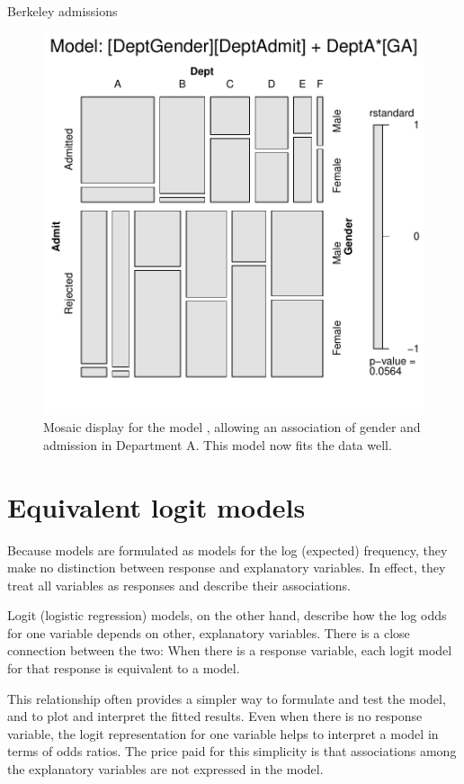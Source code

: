 \documentclass[11pt]{book}\usepackage[]{graphicx}\usepackage[]{color}
\newenvironment{knitrout}{}{} %
\renewenvironment{knitrout}{\small\renewcommand{\baselinestretch}{.85}}{} %
\begin{document}
\begin{Example}[berkeley6]{Berkeley admissions}
\begin{knitrout}
\begin{figure}[!htb]
\centerline{\includegraphics[width=.7\textwidth]{ch08/fig/berk-glm3-mosaic-1} }

\caption[Mosaic display for the model berk.glm3]{Mosaic display for the model , allowing an association of gender and admission in Department A. This model now fits the data well.\label{fig:berk-glm3-mosaic}}
\end{figure}


\end{knitrout}

\end{Example}


\section{Equivalent logit models}\label{sec:loglin-logit}

Because \loglin models are  formulated as models for the
log (expected) frequency, they make no distinction between
response and explanatory variables.
In effect, they treat all variables as responses
and describe their associations.

Logit (logistic regression) models, on the other hand,
describe how the log odds for one variable depends on other,
explanatory variables.
There is a close connection between the two:
When there is a response variable, each logit model for that response
is equivalent to a \loglin model.

This relationship often provides a simpler way to formulate and test
the model, and to plot and interpret the fitted results.
Even when there is no response variable, the logit representation
for one variable helps to interpret a \loglin model in terms of
odds ratios.
The price paid for this simplicity is that associations among the
explanatory variables are not expressed in the model.
\end{document}
